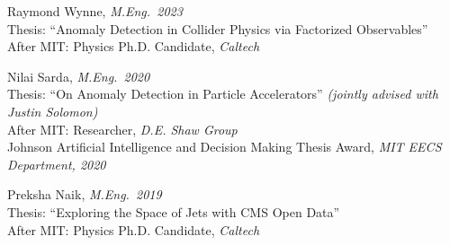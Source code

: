 \bbl

\item Raymond Wynne, \emph{M.Eng.~2023}
\\ Thesis: ``Anomaly Detection in Collider Physics via Factorized Observables''
\\ After MIT: Physics Ph.D. Candidate, \emph{Caltech}

\item Nilai Sarda, \emph{M.Eng.~2020}
\\ Thesis: ``On Anomaly Detection in Particle Accelerators'' \emph{(jointly advised with Justin Solomon)}
\\ After MIT: Researcher, \emph{D.E. Shaw Group}
\\ Johnson Artificial Intelligence and Decision Making Thesis Award, \emph{MIT EECS Department, 2020}

\item Preksha Naik, \emph{M.Eng.~2019}
\\ Thesis: ``Exploring the Space of Jets with CMS Open Data''
\\ After MIT: Physics Ph.D. Candidate, \emph{Caltech}

\el
